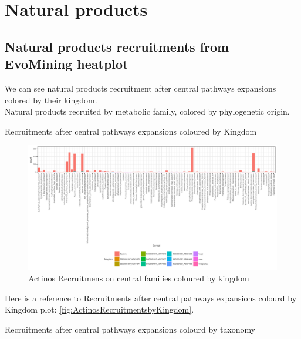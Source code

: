 \documentclass[12pt,twoside]{reedthesis}
\begin{document}
  \section{Natural products}\label{natural-products-1}
  
  \subsection{Natural products recruitments from EvoMining
  heatplot}\label{natural-products-recruitments-from-evomining-heatplot-1}
  
  We can see natural products recruitment after central pathways
  expansions colored by their kingdom.\\
  Natural products recruited by metabolic family, colored by phylogenetic
  origin.
  
  Recruitments after central pathways expansions coloured by Kingdom
  
  \begin{figure}[h!tbp]
  \centering
  \includegraphics[angle = 0,scale = 0.6]{chapter2/Actinobacteria/ActinosRecruitmentsbyKingdom.pdf}
  \caption[Actinos Recruitmens on central families coloured by kingdom]{\normalsize{Actinos Recruitmens on central families coloured by kingdom}}
  \label{fig:ActinosRecruitmentsbyKingdom}
  \end{figure}
  
  Here is a reference to Recruitments after central pathways expansions
  colourd by Kingdom plot: \autoref{fig:ActinosRecruitmentsbyKingdom}.
  
  \clearpage  Recruitments after central pathways expansions colourd by
  taxonomy
  
\end{document}
